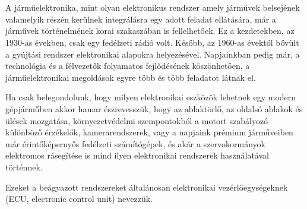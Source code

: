 \chapter{\bevezetes}




A járműelektronika, mint olyan elektronikus rendszer amely járművek belsejének valamelyik részén kerülnek integrálásra egy adott feladat ellátására, már a járművek történelmének korai szakaszában is fellelhetőek. Ez a kezdetekben, az 1930-as években, csak egy fedélzeti rádió volt. Később, az 1960-as évektől bővült a gyújtási rendszer elektronikai alapokra helyezésével. Napjainkban pedig már, a technológia és a félvezetők folyamatos fejlődésének köszönhetően, a járműelektronikai megoldások egyre több és több feladatot látnak el. 

Ha csak belegondolunk, hogy milyen elektronikai eszközök lehetnek egy modern gépjárműben akkor hamar észrevesszük, hogy az ablaktörlő, az oldalsó ablakok és ülések mozgatása, környezetvédelmi szempontokból a motort szabályozó különböző érzékelők, kamerarendszerek, vagy a napjaink prémium járműveiben már érintőképernyős fedélzeti számítógépek, és akár a szervokormányok elektromos rásegítése is mind ilyen elektronikai rendszerek használatával történnek.

Ezeket a beágyazott rendszereket általánosan elektronikai vezérlőegységeknek (ECU, electronic control unit) nevezzük.\\


